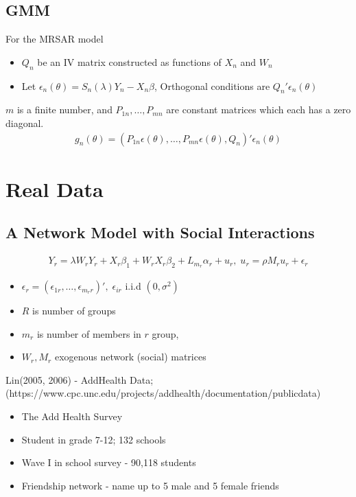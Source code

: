 \documentclass[11pt]{article}
\begin{document}
\subsection{GMM}
For the MRSAR model 
\begin{itemize}
	\item $Q_n$ be an IV matrix constructed as functions of $X_n$ and $W_n$
	\item Let $\epsilon_n(\theta) = S_n(\lambda)Y_n - X_n \beta$, Orthogonal conditions are $Q_n'\epsilon_n(\theta)$
\end{itemize}
$m$ is a finite number, and $P_{1n}, \dots , P_{mn}$ are constant matrices which each has a zero diagonal.
\begin{align}
g_n(\theta) = (P_{1n}\epsilon(\theta), \dots , P_{mn}\epsilon(\theta),Q_n)'\epsilon_n(\theta) \nonumber
\end{align}

\section{Real Data}
\subsection{A Network Model with Social Interactions}
\begin{align}
Y_r = \lambda W_r Y_r + X_r \beta_1 + W_r X_r \beta_2 + L_{m_r}\alpha_r + u_r, \; u_r = \rho M_r u_r + \epsilon_r \nonumber
\end{align}
\begin{itemize}
	\item $\epsilon_r=(\epsilon_{1r}, \dots , \epsilon_{m_r r})', \; \epsilon_{ir}$ i.i.d $(0,\sigma^2)$
	\item  $R$ is number of groups
	\item $m_r$ is number of members in $r$ group, 
	\item $W_r, M_r$ exogenous network (social) matrices
\end{itemize}
Lin(2005, 2006) - AddHealth Data; (https://www.cpc.unc.edu/projects/addhealth/documentation/publicdata)
\begin{itemize}
	\item The Add Health Survey
	\item Student in grade 7-12; 132 schools
	\item Wave I in school survey - 90,118 students
	\item Friendship network - name up to 5 male and 5 female friends
\end{itemize}
\end{document}
